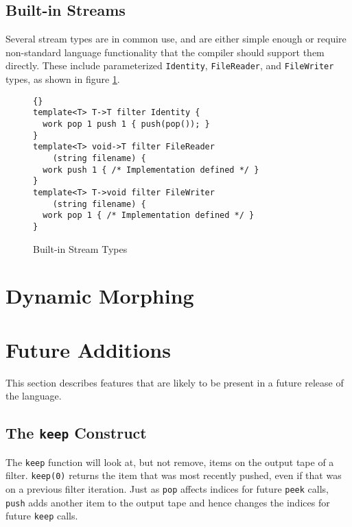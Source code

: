 \documentclass[11pt]{article}
\begin{document}
\subsection{Built-in Streams}

Several stream types are in common use, and are either simple enough
or require non-standard language functionality that the compiler
should support them directly.  These include parameterized
\lstinline|Identity|, \lstinline|FileReader|, and \lstinline|FileWriter| types, as
shown in figure \ref{fig:built-in-streams}.

\begin{figure}[htbp]
    \begin{lstlisting}{}
template<T> T->T filter Identity {
  work pop 1 push 1 { push(pop()); }
}
template<T> void->T filter FileReader
    (string filename) {
  work push 1 { /* Implementation defined */ }
}
template<T> T->void filter FileWriter
    (string filename) {
  work pop 1 { /* Implementation defined */ }
}
\end{lstlisting}
\vspace{-12pt}
    \caption{Built-in Stream Types}
    \label{fig:built-in-streams}
\end{figure}


\newpage

\newpage

\section{Dynamic Morphing}
\label{sec:morphing}

\section{Future Additions}

This section describes features that are likely to be present in a
future release of the language.

\subsection{The \lstinline|keep| Construct}

The \lstinline|keep| function will look at, but not remove, items on
the output tape of a filter.  \lstinline|keep(0)| returns the item
that was most recently pushed, even if that was on a previous filter
iteration.  Just as \lstinline|pop| affects indices for future
\lstinline|peek| calls, \lstinline|push| adds another item to the
output tape and hence changes the indices for future \lstinline|keep|
calls.
\end{document}

